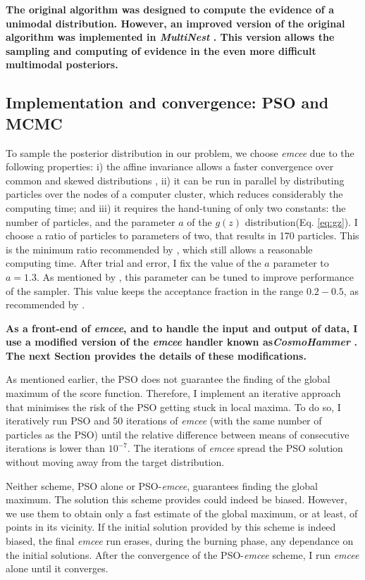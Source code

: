 \textbf{The original algorithm was designed to compute the evidence of a unimodal distribution. However, an improved version of the original algorithm was implemented in \emph{MultiNest} \citep{Feroz2009}. This version allows the sampling and computing of evidence in the even more difficult multimodal posteriors.  }

\subsection{Implementation and convergence: PSO and MCMC}
To sample the posterior distribution in our problem, we choose \emph{emcee} due to the following properties: i) the affine invariance allows a faster convergence over common and skewed distributions \cite[see][for details]{Goodman2010,Foreman2013}, ii) it can be run in parallel by distributing particles over the nodes of a computer cluster, which reduces considerably the computing time; and iii) it requires the hand-tuning of only two constants: the number of particles, and the parameter $a$ of the $g(z)$ distribution(Eq. \ref{eq:gz}). I choose a ratio of particles to parameters of two, that results in 170 particles. This is the minimum ratio recommended by \citet{Foreman2013}, which still allows a reasonable computing time. After trial and error, I fix the value of the $a$ parameter to $a=1.3$. As mentioned by \citet{Goodman2010}, this parameter can be tuned to improve performance of the sampler. This value keeps the acceptance fraction in the range $0.2-0.5$, as recommended by \citet{Foreman2013}.

\textbf{As a front-end of \emph{emcee}, and to handle the input and output of data, I use a modified version of the \emph{emcee} handler known as\emph{CosmoHammer} \citep{Akeret2013}. The next Section provides the details of these modifications. }

As mentioned earlier, the PSO does not guarantee the finding of the global maximum of the score function. Therefore, I implement an iterative approach that minimises the risk of the PSO getting stuck in local maxima. To do so, I iteratively run PSO and 50 iterations of \emph{emcee} (with the same number of particles as the PSO) until the relative difference between means of consecutive iterations is lower than $10^{-7}$. The iterations of \emph{emcee} spread the PSO solution without moving away from the target distribution. 
 
Neither scheme, PSO alone or PSO-\emph{emcee}, guarantees finding the global maximum. The solution this scheme provides could indeed be biased. However, we use them to obtain only a fast estimate of the global maximum, or at least, of points in its vicinity. If the initial solution provided by this scheme is indeed biased, the final \emph{emcee} run erases, during the burning phase, any dependance on the initial solutions. After the convergence of the PSO-\emph{emcee} scheme, I run \emph{emcee} alone until it converges.  
 
